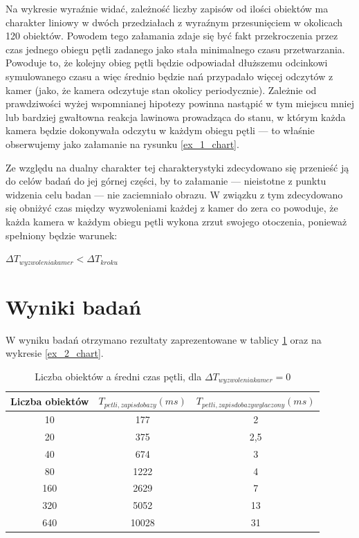 \par{
Na wykresie wyraźnie widać, zależność liczby zapisów od ilości obiektów ma charakter liniowy w dwóch przedziałach z wyraźnym przesunięciem w okolicach 120 obiektów. Powodem tego załamania zdaje się być fakt przekroczenia przez czas jednego obiegu pętli zadanego jako stała minimalnego czasu przetwarzania.  Powoduje to, że kolejny obieg pętli będzie odpowiadał dłuższemu odcinkowi symulowanego czasu a więc średnio będzie nań przypadało więcej odczytów z kamer (jako, że kamera odczytuje stan okolicy periodycznie). Zależnie od prawdziwości wyżej wspomnianej hipotezy powinna nastąpić w tym miejscu mniej lub bardziej gwałtowna reakcja lawinowa prowadząca do stanu, w którym każda kamera będzie dokonywała odczytu w każdym obiegu pętli --- to właśnie obserwujemy jako załamanie na rysunku \ref{ex_1_chart}.
}
\par{
Ze względu na dualny charakter tej charakterystyki zdecydowano się przenieść ją do celów badań do jej górnej części, by to załamanie --- nieistotne z punktu widzenia celu badan --- nie zaciemniało obrazu. W związku z tym zdecydowano się obniżyć czas między wyzwoleniami każdej z kamer do zera co powoduje, że każda kamera w każdym obiegu pętli wykona zrzut swojego otoczenia, ponieważ spełniony będzie warunek:
}
\par{
\begin{center}
$\Delta T_{wyzwolenia kamer} < \Delta T_{kroku}$
\end{center}
}

\section{Wyniki badań}
\par{
W wyniku badań otrzymano rezultaty zaprezentowane w tablicy \ref{ex_2} oraz na wykresie \ref{ex_2_chart}.
}

\par{
\begin{table}[t]
\caption{Liczba obiektów a średni czas pętli, dla $\Delta T_{wyzwolenia kamer} = 0$}
\label{ex_2}
\begin{center}
\begin{tabular}{|c|c|c|}
  \hline 
  \textbf{Liczba obiektów} & \textbf{$T_{petli, zapis do bazy} (ms)$} & \textbf{$T_{petli, zapis do bazy wylaczony} (ms)$}\\
  \hline
10 & 177 & 2 \\
20 & 375 & 2,5 \\
40 & 674 & 3 \\
80 & 1222 & 4 \\
160 & 2629 & 7 \\
320 & 5052 & 13 \\
640 & 10028 & 31 \\
  \hline  
\end{tabular}
\end{center}
\end{table}
}

